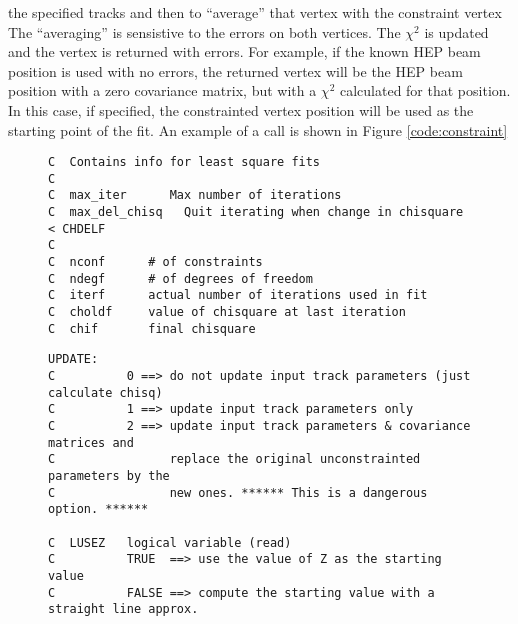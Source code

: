                              the specified tracks and then to ``average'' that
                             vertex with the constraint vertex
                             The ``averaging'' is sensistive to the
                             errors on both vertices.   The $\chi^2$ is updated
                             and the vertex is returned with errors.  For
                             example, if the
                             known {\small HEP} beam position is used with no
                             errors, the returned vertex will be the {\small
                             HEP} beam position with a zero covariance matrix,
                             but with a $\chi^2$ calculated for that position.
                             In this case, if specified, the constrainted
                             vertex position will be used as the starting point
                             of the fit.
                             An example of a call is shown in Figure
                             \ref{code:constraint}
                             

\begin{figure}
\begin{tt}
\begin{verbatim}
C  Contains info for least square fits
C
C  max_iter      Max number of iterations
C  max_del_chisq   Quit iterating when change in chisquare < CHDELF
C
C  nconf      # of constraints
C  ndegf      # of degrees of freedom
C  iterf      actual number of iterations used in fit
C  choldf     value of chisquare at last iteration
C  chif       final chisquare
\end{verbatim}
\end{tt}
\label{code:kinechi}
\end{figure}

\begin{figure}
\begin{tt}
\begin{verbatim}
UPDATE: 
C          0 ==> do not update input track parameters (just calculate chisq)
C          1 ==> update input track parameters only
C          2 ==> update input track parameters & covariance matrices and
C                replace the original unconstrainted parameters by the
C                new ones. ****** This is a dangerous option. ******

C  LUSEZ   logical variable (read)
C          TRUE  ==> use the value of Z as the starting value
C          FALSE ==> compute the starting value with a straight line approx.

\end{verbatim}
\end{tt}
\label{code:flags}
\end{figure}
 
